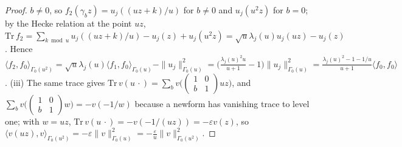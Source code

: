 \documentclass[11pt,a4paper]{article}
\theoremstyle{remark}\newtheorem{remark}[theorem]{Remark}
\begin{document}
\begin{proof}
$b\ne0$, so $f_2(\gamma_bz)=u_j((uz+k)/u)$ for $b\ne0$ and $u_j(u^2z)$ for $b=0$; by the Hecke relation at the point $uz$,
$\mathrm{Tr}\,f_2=\sum_{k\bmod u}u_j((uz+k)/u)-u_j(z)+u_j(u^2z)=\sqrt u\lambda_j(u)u_j(uz)-u_j(z)$. Hence
$\langle f_2,f_0\rangle_{\Gamma_0(u^2)}=\sqrt u\lambda_j(u)\langle f_1,f_0\rangle_{\Gamma_0(u)}-\|u_j\|^2_{\Gamma_0(u)}
=\bigl(\tfrac{\lambda_j(u)^2u}{u+1}-1\bigr)\|u_j\|^2_{\Gamma_0(u)}=\tfrac{\lambda_j(u)^2-1-1/u}{u+1}\langle f_0,f_0\rangle$.
(iii) The same trace gives $\mathrm{Tr}\,v(u\,\cdot)=\sum_b v\bigl(\left(\begin{smallmatrix}1&0\\ b&1\end{smallmatrix}\right)uz\bigr)$, and
$\sum_bv\bigl(\left(\begin{smallmatrix}1&0\\ b&1\end{smallmatrix}\right)w\bigr)=-v(-1/w)$ because a newform has vanishing trace to
level one; with $w=uz$, $\mathrm{Tr}\,v(u\,\cdot)=-v(-1/(uz))=-\varepsilon v(z)$, so $\langle v(uz),v\rangle_{\Gamma_0(u^2)}=-\varepsilon\|v\|^2_{\Gamma_0(u)}=-\frac\varepsilon u\|v\|^2_{\Gamma_0(u^2)}$.
\end{proof}
\end{document}
